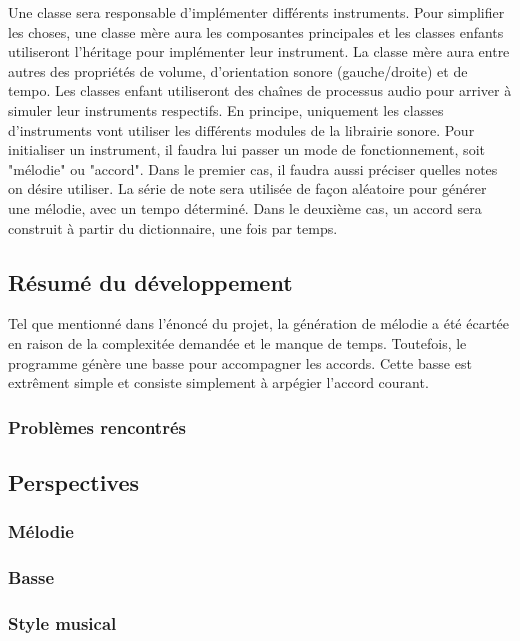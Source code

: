 \documentclass[letterpaper,12pt]{scrartcl}
\begin{document}
	Une classe sera responsable d'implémenter différents instruments. Pour simplifier les choses, une classe mère aura les composantes principales et les classes enfants utiliseront l'héritage pour implémenter leur instrument. La classe mère aura entre autres des propriétés de volume, d'orientation sonore (gauche/droite) et de tempo. Les classes enfant utiliseront des chaînes de processus audio pour arriver à simuler leur instruments respectifs. En principe, uniquement les classes d'instruments vont utiliser les différents modules de la librairie sonore. Pour initialiser un instrument, il faudra lui passer un mode de fonctionnement, soit "mélodie" ou "accord". Dans le premier cas, il faudra aussi préciser quelles notes on désire utiliser. La série de note sera utilisée de façon aléatoire pour générer une mélodie, avec un tempo déterminé. Dans le deuxième cas, un accord sera construit à partir du dictionnaire, une fois par temps. 
	
	
	\subsection{Résumé du développement}
	Tel que mentionné dans l'énoncé du projet, la génération de mélodie a été écartée en raison de la complexitée demandée et le manque de temps. Toutefois, le programme génère une basse pour accompagner les accords. Cette basse est extrêment simple et consiste simplement à arpégier l'accord courant. 
	\subsubsection{Problèmes rencontrés}
	
	\subsection{Perspectives}
		\subsubsection{Mélodie}
		\subsubsection{Basse}
		\subsubsection{Style musical}
\end{document}
